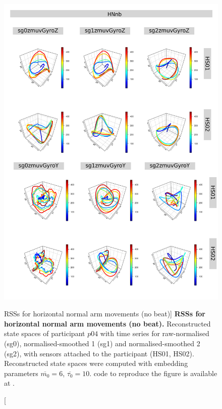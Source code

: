 \begin{figure}
\centering
\includegraphics[height=0.8\textheight]{rss_HNnb_p04}
\caption
	[RSSs for horizontal normal arm movements (no beat)]{
	{\bf RSSs for horizontal normal arm movements (no beat).}
	Reconstructed state spaces of participant $p04$
	with time series for raw-normalised (sg0), 
	normalised-smoothed 1 (sg1) and 
	normalised-smoothed 2 (sg2), 
	with sensors attached to the participant (HS01, HS02).
	Reconstructed state spaces were computed with 
	embedding parameters $\overline{m_0}=6$, $\overline{\tau_0}=10$.
		\R code to reproduce the figure is available at 
		.
        }
     \label{fig:rss_HNnb_p04}
\end{figure}



